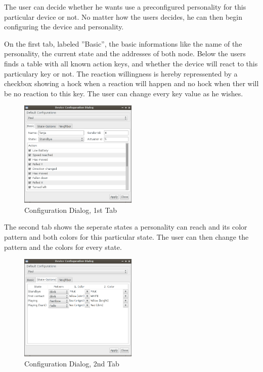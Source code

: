 The user can decide whether he wants use a preconfigured personality for this particular device or not. No matter how the users decides, he can then begin configuring the device and personality.

On the first tab, labeled ''Basic'', the basic informations like the name of the personality, the current state and the addresses of both node. Below the users finds a table with all known action keys, and whether the device will react to this particulary key or not. The reaction willingness is hereby repressented by a checkbox showing a hock when a reaction will happen and no hock when ther will be no reaction to this key. The user can change every key value as he wishes.

\begin{figure}[h!]
 \centering
 \includegraphics[width= 0.5\textwidth, clip=true  ,keepaspectratio=true]{./pic/java-server-config01.png}
 \caption{Configuration Dialog, 1st Tab}
 \label{fig:java-server-config01}
\end{figure}

The second tab shows the seperate states a personality can reach and its color pattern and both colors for this particular state. The user can then change the pattern and the colors for every state.


\begin{figure}[h!]
 \centering
 \includegraphics[width= 0.5\textwidth, clip=true  ,keepaspectratio=true]{./pic/java-server-config02.png}
 \caption{Configuration Dialog, 2nd Tab}
 \label{fig:java-server-config01}
\end{figure}


